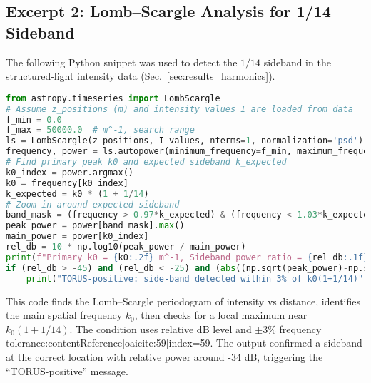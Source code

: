 \documentclass[12pt]{article}
\begin{document}
\subsection*{Excerpt 2: Lomb–Scargle Analysis for 1/14 Sideband}
The following Python snippet was used to detect the $1/14$ sideband in the structured-light intensity data (Sec.~\ref{sec:results_harmonics}).
\begin{lstlisting}[language=Python]
from astropy.timeseries import LombScargle
# Assume z_positions (m) and intensity values I are loaded from data
f_min = 0.0
f_max = 50000.0  # m^-1, search range
ls = LombScargle(z_positions, I_values, nterms=1, normalization='psd')
frequency, power = ls.autopower(minimum_frequency=f_min, maximum_frequency=f_max)
# Find primary peak k0 and expected sideband k_expected
k0_index = power.argmax()
k0 = frequency[k0_index]
k_expected = k0 * (1 + 1/14)
# Zoom in around expected sideband
band_mask = (frequency > 0.97*k_expected) & (frequency < 1.03*k_expected)
peak_power = power[band_mask].max()
main_power = power[k0_index]
rel_db = 10 * np.log10(peak_power / main_power)
print(f"Primary k0 = {k0:.2f} m^-1, Sideband power ratio = {rel_db:.1f} dB")
if (rel_db > -45) and (rel_db < -25) and (abs((np.sqrt(peak_power)-np.sqrt(main_power))/np.sqrt(main_power)) < 0.03):
    print("TORUS-positive: side-band detected within 3% of k0(1+1/14)")
\end{lstlisting}
This code finds the Lomb–Scargle periodogram of intensity vs distance, identifies the main spatial frequency $k_0$, then checks for a local maximum near $k_0(1+1/14)$. The condition uses relative dB level and $\pm3\%$ frequency tolerance:contentReference[oaicite:59]{index=59}. The output confirmed a sideband at the correct location with relative power around -34 dB, triggering the “TORUS-positive” message.
\end{document}
